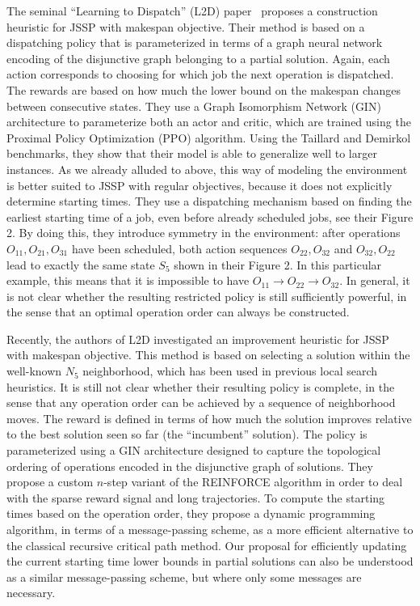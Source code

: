 \documentclass{article}
\theoremstyle{definition}
\theoremstyle{plain}
\begin{document}
The seminal ``Learning to Dispatch'' (L2D)
paper~\cite{zhangLearningDispatchJob2020} proposes a construction heuristic for
JSSP with makespan objective. Their method is based on a dispatching policy that
is parameterized in terms of a graph neural network encoding of the disjunctive
graph belonging to a partial solution. Again, each action corresponds to
choosing for which job the next operation is dispatched. The rewards are based
on how much the lower bound on the makespan changes between consecutive states.
They use a Graph Isomorphism Network (GIN) architecture to parameterize both an
actor and critic, which are trained using the Proximal Policy Optimization (PPO)
algorithm. Using the Taillard and Demirkol benchmarks, they show that their
model is able to generalize well to larger instances.
As we already alluded to above, this way of modeling the environment is better
suited to JSSP with regular objectives, because it does not explicitly determine
starting times.
%
They use a dispatching mechanism based on finding the earliest starting time of
a job, even before already scheduled jobs, see their Figure 2. By doing this,
they introduce symmetry in the environment: after operations
$O_{11}, O_{21}, O_{31}$ have been scheduled, both action sequences
$O_{22}, O_{32}$ and $O_{32}, O_{22}$ lead to exactly the same state $S_5$ shown
in their Figure 2. In this particular example, this means that it is impossible
to have $O_{11} \rightarrow O_{22} \rightarrow O_{32}$. In general, it is not
clear whether the resulting restricted policy is still sufficiently powerful, in
the sense that an optimal operation order can always be constructed.


Recently, the authors of L2D investigated an improvement heuristic for
JSSP~\cite{zhangDeepReinforcementLearning2024} with makespan objective.
%
This method is based on selecting a solution within the well-known $N_5$
neighborhood, which has been used in previous local search heuristics.
%
It is still not clear whether their resulting policy is complete, in the sense
that any operation order can be achieved by a sequence of neighborhood moves.
%
The reward is defined in terms of how much the solution improves relative to the
best solution seen so far (the ``incumbent'' solution). The policy is
parameterized using a GIN architecture designed to capture the topological
ordering of operations encoded in the disjunctive graph of solutions. They
propose a custom $n$-step variant of the REINFORCE algorithm in order to deal
with the sparse reward signal and long trajectories.
%
To compute the starting times based on the operation order, they propose a
dynamic programming algorithm, in terms of a message-passing scheme, as a more
efficient alternative to the classical recursive critical path method.
%
Our proposal for efficiently updating the current starting time lower bounds in
partial solutions can also be understood as a similar message-passing scheme,
but where only some messages are necessary.
\end{document}
